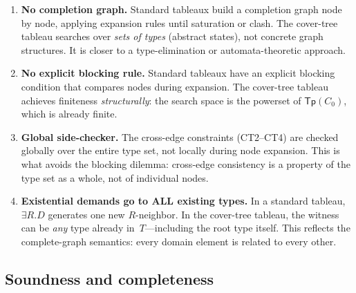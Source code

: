 \documentclass[
]{ceurart}
\theoremstyle{definition}
\newcommand{\Tp}{\ensuremath{\mathsf{Tp}}}
\begin{document}
\begin{enumerate}
  \item \textbf{No completion graph.}  Standard tableaux build a
    completion graph node by node, applying expansion rules until
    saturation or clash.  The cover-tree tableau searches over
    \emph{sets of types} (abstract states), not concrete graph
    structures.  It is closer to a type-elimination or
    automata-theoretic approach.

  \item \textbf{No explicit blocking rule.}  Standard tableaux
    have an explicit blocking condition that compares nodes during
    expansion.  The cover-tree tableau achieves finiteness
    \emph{structurally}: the search space is the powerset of
    $\Tp(C_0)$, which is already finite.

  \item \textbf{Global side-checker.}  The cross-edge constraints
    (CT2--CT4) are checked globally over the entire type set,
    not locally during node expansion.  This is what avoids the
    blocking dilemma: cross-edge consistency is a property of
    the type set as a whole, not of individual nodes.

  \item \textbf{Existential demands go to ALL existing types.}
    In a standard tableau, $\exists R.D$ generates one new
    $R$-neighbor.  In the cover-tree tableau, the witness can
    be \emph{any} type already in~$T$---including the root type
    itself.  This reflects the complete-graph semantics: every
    domain element is related to every other.
\end{enumerate}

\subsection{Soundness and completeness}
\label{ssec:soundness-completeness}
\end{document}
